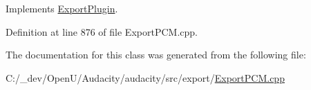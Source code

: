 Implements \hyperlink{class_export_plugin_ae598d111eb0d4e8b3c7349beb6d58527}{Export\+Plugin}.



Definition at line 876 of file Export\+P\+C\+M.\+cpp.



The documentation for this class was generated from the following file\+:\begin{DoxyCompactItemize}
\item 
C\+:/\+\_\+dev/\+Open\+U/\+Audacity/audacity/src/export/\hyperlink{_export_p_c_m_8cpp}{Export\+P\+C\+M.\+cpp}\end{DoxyCompactItemize}
